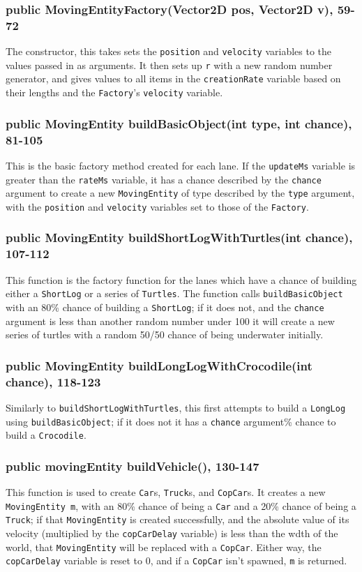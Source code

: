 \documentclass[12pt]{article}
\begin{document}
\subsubsection{public MovingEntityFactory(Vector2D pos, Vector2D v), 59-72}
The constructor, this takes sets the \verb|position| and \verb|velocity| variables to the values passed in as arguments.
It then sets up \verb|r| with a new random number generator, and gives values to all items in the \verb|creationRate| variable based on their lengths and the \verb|Factory|'s \verb|velocity| variable.

\subsubsection{public MovingEntity buildBasicObject(int type, int chance), 81-105}
This is the basic factory method created for each lane.
If the \verb|updateMs| variable is greater than the \verb|rateMs| variable, it has a chance described by the \verb|chance| argument to create a new \verb|MovingEntity| of type described by the \verb|type| argument, with the \verb|position| and \verb|velocity| variables set to those of the \verb|Factory|.

\subsubsection{public MovingEntity buildShortLogWithTurtles(int chance), 107-112}
This function is the factory function for the lanes which have a chance of building either a \verb|ShortLog| or a series of \verb|Turtles|.
The function calls \verb|buildBasicObject| with an 80\% chance of building a \verb|ShortLog|; if it does not, and the \verb|chance| argument is less than another random number under 100 it will create a new series of turtles with a random 50/50 chance of being underwater initially.

\subsubsection{public MovingEntity buildLongLogWithCrocodile(int chance), 118-123}
Similarly to \verb|buildShortLogWithTurtles|, this first attempts to build a \verb|LongLog| using \verb|buildBasicObject|; if it does not it has a \verb|chance| argument\% chance to build a \verb|Crocodile|.

\subsubsection{public movingEntity buildVehicle(), 130-147}
This function is used to create \verb|Car|s, \verb|Truck|s, and \verb|CopCar|s.
It creates a new \verb|MovingEntity m|, with an 80\% chance of being a \verb|Car| and a 20\% chance of being a \verb|Truck|; if that \verb|MovingEntity| is created successfully, and the absolute value of its velocity (multiplied by the \verb|copCarDelay| variable) is less than the wdth of the world, that \verb|MovingEntity| will be replaced with a \verb|CopCar|.
Either way, the \verb|copCarDelay| variable is reset to 0, and if a \verb|CopCar| isn't spawned, \verb|m| is returned.
\end{document}
